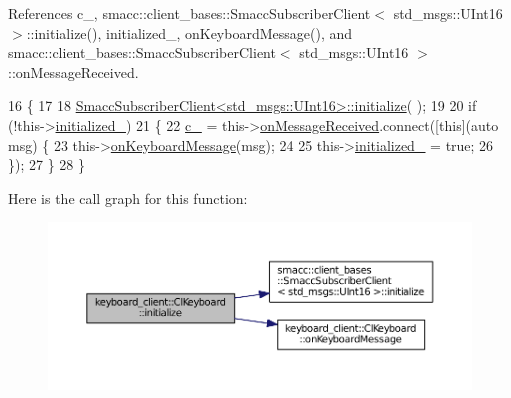 References c\+\_\+, smacc\+::client\+\_\+bases\+::\+Smacc\+Subscriber\+Client$<$ std\+\_\+msgs\+::\+U\+Int16 $>$\+::initialize(), initialized\+\_\+, on\+Keyboard\+Message(), and smacc\+::client\+\_\+bases\+::\+Smacc\+Subscriber\+Client$<$ std\+\_\+msgs\+::\+U\+Int16 $>$\+::on\+Message\+Received.


\begin{DoxyCode}
16 \{
17 
18     \hyperlink{classsmacc_1_1client__bases_1_1SmaccSubscriberClient_af188f0f5e89de26a07e1f964cdd23a70}{SmaccSubscriberClient<std\_msgs::UInt16>::initialize}(
      );
19 
20     \textcolor{keywordflow}{if} (!this->\hyperlink{classkeyboard__client_1_1ClKeyboard_aff74d4f212f4846a1f7cc6c0e4d5f728}{initialized\_})
21     \{
22         \hyperlink{classkeyboard__client_1_1ClKeyboard_a32d0c1c037454900708b58b709767e56}{c\_} = this->\hyperlink{classsmacc_1_1client__bases_1_1SmaccSubscriberClient_a2703867f1ee638c5fffa680f93cee29a}{onMessageReceived}.connect([\textcolor{keyword}{this}](\textcolor{keyword}{auto} msg) \{
23             this->\hyperlink{classkeyboard__client_1_1ClKeyboard_adbfb9c2b98f784b12cf7740b4e861d8e}{onKeyboardMessage}(msg);
24 
25             this->\hyperlink{classkeyboard__client_1_1ClKeyboard_aff74d4f212f4846a1f7cc6c0e4d5f728}{initialized\_} = \textcolor{keyword}{true};
26         \});
27     \}
28 \}
\end{DoxyCode}


Here is the call graph for this function\+:
\nopagebreak
\begin{figure}[H]
\begin{center}
\leavevmode
\includegraphics[width=350pt]{classkeyboard__client_1_1ClKeyboard_a7ac4502969c62b0c836b531cec05f8ed_cgraph}
\end{center}
\end{figure}



